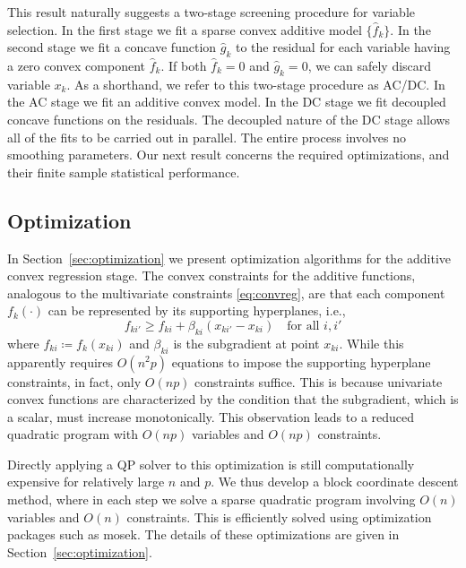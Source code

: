 This result naturally suggests a two-stage screening
procedure for variable selection. In the first stage we fit a sparse convex
additive model $\{\hat f_k\}$.  In the second stage we
fit a concave function $\hat g_k$ to the residual for each variable
having a zero convex component $\hat f_k$.  If both $\hat f_k = 0$ and
$\hat g_k = 0$, we can safely discard variable $x_k$.  
As a shorthand, we refer to this two-stage procedure as AC/DC.  In 
the AC stage we fit an additive convex model.  In the DC 
stage we fit decoupled concave functions on the residuals.  The
decoupled nature of the DC stage allows all of the fits to
be carried out in parallel. The entire process involves no smoothing parameters.
Our next result concerns the required optimizations, and their finite
sample statistical performance.


\subsection{Optimization}

In Section~\ref{sec:optimization} we present optimization algorithms for the additive convex regression stage.
The convex constraints for the additive functions, analogous to 
the multivariate constraints \eqref{eq:convreg},
are  that each component $f_{k}(\cdot)$ 
can be represented by its supporting hyperplanes, i.e.,
\begin{equation}
      f_{ki'} \geq f_{ki} + \beta_{ki}(x_{ki'}-x_{ki}) \quad \text{for
        all $i,i'$}
\end{equation}
where $f_{ki}\coloneqq f_{k}(x_{ki})$ and $\beta_{ki}$ is the
subgradient at point $x_{ki}$. While this apparently requires $O(n^2
p)$ equations to impose the supporting hyperplane constraints, 
in fact, only $O(np)$ constraints suffice.  This is because univariate convex functions are
characterized by the condition that the subgradient, which is a scalar, must
increase monotonically. This observation leads to a reduced quadratic
program with $O(np)$ variables and $O(np)$ constraints. 

Directly applying a QP solver to this optimization is still computationally
expensive for relatively large
$n$ and $p$.  We thus develop a block
coordinate descent method, where in each step we solve a sparse
quadratic program involving $O(n)$ variables and $O(n)$ constraints.  This 
is efficiently solved using optimization packages 
such as {\sc mosek}.  The details of these optimizations
are given in Section~\ref{sec:optimization}.



